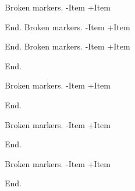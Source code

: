 Broken markers.
-Item
+Item

End.
Broken markers.
-Item
+Item

End.
Broken markers.
-Item
+Item

End.
\begin{frame}[t]
Broken markers.
-Item
+Item

End.
\end{frame}

\begin{frame}[t]
Broken markers.
-Item
+Item

End.
\end{frame}

\begin{frame}[t]
Broken markers.
-Item
+Item

End.
\end{frame}

